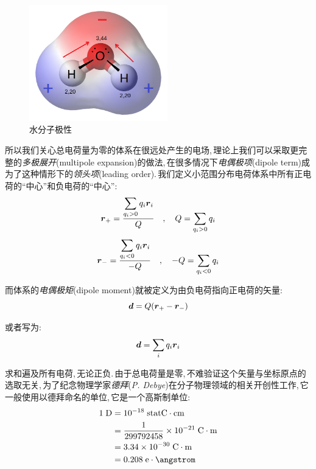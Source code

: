 \begin{figure}
\centering
\vspace{-0.6cm}
\includegraphics[width=6cm]{image/7-1-11.png}
\caption{水分子极性}
\end{figure}
所以我们关心总电荷量为零的体系在很远处产生的电场,\,理论上我们可以采取更完整的\emph{多极展开}(multipole expansion)的做法,\,在很多情况下\emph{电偶极项}(dipole term)成为了这种情形下的\emph{领头项}(leading order).\,我们定义小范围分布电荷体系中所有正电荷的``中心''和负电荷的``中心'':
\[\boldsymbol{r}_+=\frac{\displaystyle\sum_{q_i>0} q_i \boldsymbol{r}_i}{Q}\quad,\quad Q=\sum_{q_i>0} q_i\]
\[\boldsymbol{r}_-=\frac{\displaystyle\sum_{q_i<0} q_i \boldsymbol{r}_i}{-Q}\quad,\quad -Q=\sum_{q_i<0} q_i\]

而体系的\emph{电偶极矩}(dipole moment)就被定义为由负电荷指向正电荷的矢量:
\[\boldsymbol{d}=Q(\boldsymbol{r}_+-\boldsymbol{r}_-)\]

或者写为:
\[\boldsymbol{d}=\sum_{i} q_i \boldsymbol{r}_i\]

求和遍及所有电荷,\,无论正负.\,由于总电荷量是零,\,不难验证这个矢量与坐标原点的选取无关,\,为了纪念物理学家\emph{德拜}({\it P. Debye})在分子物理领域的相关开创性工作,\,它一般使用以德拜命名的单位,\,它是一个高斯制单位:
\begin{align*}
1 \;{\rm D} 	&=10^{-18} \;{\rm statC\cdot cm} \\
			&=\frac{1}{299792458}\times 10^{-21} \;{\rm C\cdot m} \\
			&=3.34\pow{-30} \;{\rm C\cdot m} \\
			&=0.208 \;{\rm e\cdot \angstrom}
\end{align*}


